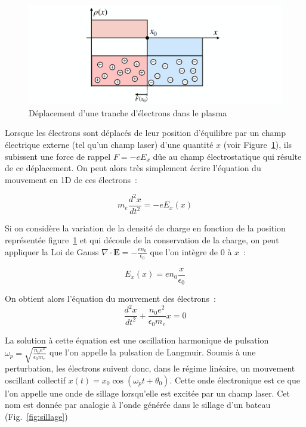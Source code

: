 \documentclass[a4paper]{book}
\begin{document}
\begin{figure}[!htbp]
\begin{center}
\includegraphics[width=15cm]{pictures/PlasmaOsc.png}
\end{center}
\caption{Déplacement d'une tranche d'électrons dans le plasma}
\label{fig:osc_plas}
\end{figure}

Lorsque les électrons sont déplacés de leur position d'équilibre par un champ électrique externe (tel qu'un champ laser) d'une quantité $x$ (voir Figure~\ref{fig:osc_plas}), ils subissent une force de rappel $F=-e E_x$ dûe au champ électrostatique qui résulte de ce déplacement. On peut alors très simplement écrire l'équation du mouvement en 1D de ces électrons~: 

\begin{equation}
    m_e\frac{d^2 x}{dt^2}=-eE_x(x)
\end{equation}

Si on considère la variation de la densité de charge en fonction de la position représentée figure~\ref{fig:osc_plas} et qui découle de la conservation de la charge, on peut appliquer la Loi de Gauss $\nabla\cdot\textbf{E}=-\frac{e n_0}{\epsilon_0}$ que l'on intègre de 0 à $x$~: 

\begin{equation}
    E_x(x) = en_0\frac{x}{\epsilon_0}
    \label{eq:chp_E}
\end{equation}

On obtient alors l'équation du mouvement des électrons~:
\begin{equation}
    \frac{d^2x}{dt^2}+\frac{n_0e^2}{\epsilon_0 m_e} x =0
\end{equation}

La solution à cette équation est une oscillation harmonique de pulsation $\omega_p = \sqrt{\frac{n_0 e^2}{\epsilon_0 m_e}}$ que l'on appelle la pulsation de Langmuir. 
Soumis à une perturbation, les électrons suivent donc, dans le régime linéaire, un mouvement oscillant collectif $x(t) = x_0\cos(\omega_p t +\theta_0)$. 
Cette onde électronique est ce que l'on appelle une onde de sillage lorsqu'elle est excitée par un champ laser. Cet nom est donnée par analogie à l'onde générée dans le sillage d'un bateau (Fig.~\ref{fig:sillage})
\end{document}
